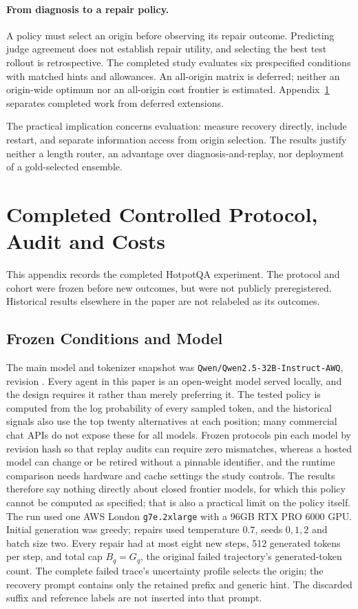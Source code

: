 \documentclass{article}
\begin{document}
\paragraph{From diagnosis to a repair policy.}
A policy must select an origin before observing its repair outcome.
Predicting judge agreement does not establish repair utility, and selecting
the best test rollout is retrospective. The completed study evaluates six
prespecified conditions with matched hints and allowances. An all-origin
matrix is deferred; neither an origin-wide optimum nor an all-origin cost
frontier is estimated. Appendix~\ref{app:completion} separates completed work
from deferred extensions.

The practical implication concerns evaluation: measure recovery directly,
include restart, and separate information access from origin selection.
The results justify neither a length router, an advantage over
diagnosis-and-replay, nor deployment of a gold-selected ensemble.

\section{Completed Controlled Protocol, Audit and Costs}
\label{app:completion}
This appendix records the completed HotpotQA experiment. The protocol and
cohort were frozen before new outcomes, but were not publicly preregistered.
Historical results elsewhere in the paper are not relabeled as its outcomes.

\subsection{Frozen Conditions and Model}
The main model and tokenizer snapshot was
\texttt{Qwen/Qwen2.5-32B-Instruct-AWQ}, revision
.
Every agent in this paper is an open-weight model served locally, and the
design requires it rather than merely preferring it. The tested policy is
computed from the log probability of every sampled token, and the historical
signals also use the top twenty alternatives at each position; many
commercial chat APIs do not expose these for all models. Frozen protocols
pin each model by revision hash so that replay audits can require zero
mismatches, whereas a hosted model can change or be retired without a
pinnable identifier, and the runtime comparison needs hardware and cache
settings the study controls. The results therefore say nothing directly about
closed frontier models, for which this policy cannot be computed as
specified; that is also a practical limit on the policy itself. The run used one AWS
London \texttt{g7e.2xlarge} with a 96GB RTX PRO 6000 GPU. Initial generation
was greedy; repairs used temperature $0.7$, seeds $0,1,2$ and batch size two.
Every repair had at most eight new steps, 512 generated tokens per step,
and total cap $B_q=G_q$, the original failed trajectory's generated-token
count. The complete failed trace's uncertainty profile selects the origin;
the recovery prompt contains only the retained prefix and generic hint.
The discarded suffix and reference labels are not inserted into that prompt.
\end{document}

